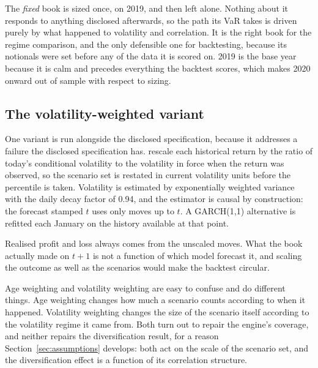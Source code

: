 The \emph{fixed} book is sized once, on 2019, and then left alone. Nothing
about it responds to anything disclosed afterwards, so the path its VaR takes
is driven purely by what happened to volatility and correlation. It is the
right book for the regime comparison, and the only defensible one for
backtesting, because its notionals were set before any of the data it is scored
on. 2019 is the base year because it is calm and precedes everything the
backtest scores, which makes 2020 onward out of sample with respect to sizing.

\subsection{The volatility-weighted variant}

One variant is run alongside the disclosed specification, because it addresses
a failure the disclosed specification has.
\citet{hullwhite1998} rescale each historical return by the ratio of today's
conditional volatility to the volatility in force when the return was observed,
so the scenario set is restated in current volatility units before the
percentile is taken. Volatility is estimated by exponentially weighted variance
with the \citet{riskmetrics1996} daily decay factor of 0.94, and the estimator
is causal by construction: the forecast stamped $t$ uses only moves up to $t$.
A GARCH(1,1) alternative is refitted each January on the history available at
that point.

Realised profit and loss always comes from the unscaled moves. What the book
actually made on $t+1$ is not a function of which model forecast it, and
scaling the outcome as well as the scenarios would make the backtest circular.

Age weighting and volatility weighting are easy to confuse and do different
things. Age weighting changes how much a scenario counts according to when it
happened. Volatility weighting changes the size of the scenario itself
according to the volatility regime it came from. Both turn out to repair the
engine's coverage, and neither repairs the diversification result, for a reason
Section~\ref{sec:assumptions} develops: both act on the scale of the scenario
set, and the diversification effect is a function of its correlation structure.
